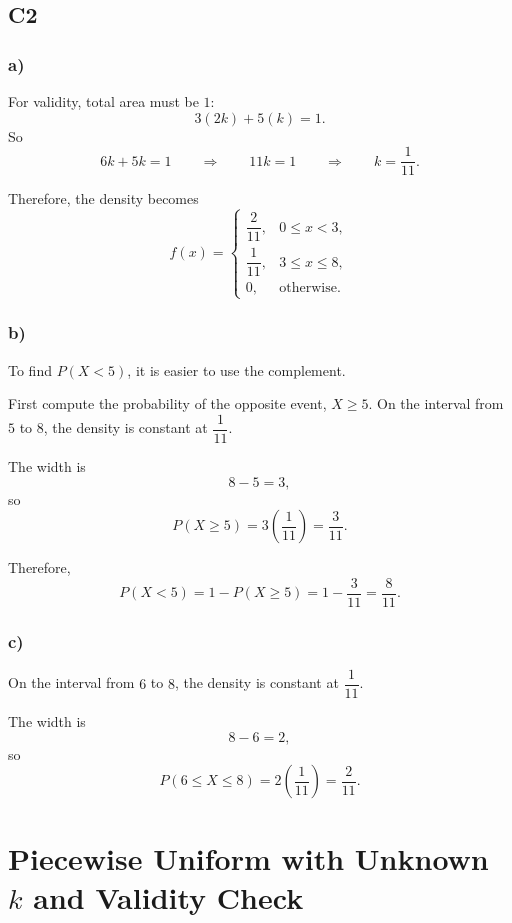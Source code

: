 \subsection*{C2}

\subsubsection*{a)}
For validity, total area must be $1$:
\[
3(2k)+5(k)=1.
\]
So
\[
6k+5k=1
\qquad \Rightarrow \qquad
11k=1
\qquad \Rightarrow \qquad
k=\frac{1}{11}.
\]

Therefore, the density becomes
\[
f(x)=
\begin{cases}
	\dfrac{2}{11}, & 0\le x<3,\\[6pt]
	\dfrac{1}{11}, & 3\le x\le 8,\\[6pt]
	0, & \text{otherwise.}
\end{cases}
\]


\subsubsection*{b)}
To find $P(X<5)$, it is easier to use the complement.

First compute the probability of the opposite event, $X\ge 5$. On the interval from $5$ to $8$, the density is constant at $\dfrac{1}{11}$.

The width is
\[
8-5=3,
\]
so
\[
P(X\ge 5)=3\left(\frac{1}{11}\right)=\frac{3}{11}.
\]

Therefore,
\[
P(X<5)=1-P(X\ge 5)=1-\frac{3}{11}=\frac{8}{11}.
\]


\subsubsection*{c)}
On the interval from $6$ to $8$, the density is constant at $\dfrac{1}{11}$.

The width is
\[
8-6=2,
\]
so
\[
P(6\le X\le 8)=2\left(\frac{1}{11}\right)=\frac{2}{11}.
\]


\section{Piecewise Uniform with Unknown $k$ and Validity Check}

